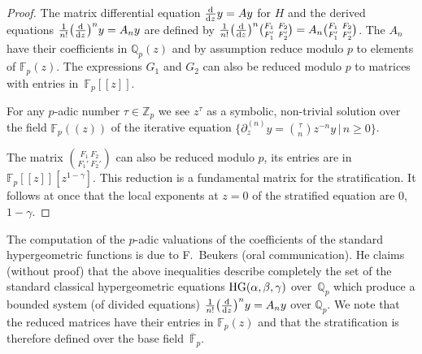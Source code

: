\documentclass[pdftex]{sigma}
\numberwithin{equation}{section}
\begin{document}
\begin{proof}
The matrix differential equation $\frac{{\rm d}}{{\rm d}z} y=Ay$ for $H$ and the derived equations $\frac{1}{n!}\big(\frac{{\rm d}}{{\rm d}z}\big)^ny=A_ny$ are defined by $\frac{1}{n!}\big(\frac{{\rm d}}{{\rm d}z}\big)^n {F_1\ F_2 \choose F_1'\ F_2'}=A_n{F_1\ F_2 \choose F_1' \ F_2'}$. The $A_n$ have their coefficients in $\mathbb{Q}_p(z)$ and by assumption reduce modulo $p$ to elements of $\mathbb{F}_p(z)$. The expressions $G_1$ and $G_2$ can also be reduced modulo $p$ to matrices with entries in~$\mathbb{F}_p[[z]]$.

For any $p$-adic number $\tau \in \mathbb{Z}_p$ we see $z^\tau$ as a symbolic, non-trivial solution over the field $\mathbb{F}_p((z))$ of the iterative equation $\big\{\partial_z^{(n)}y={\tau \choose n }z^{-n}y\, | \, n\geq 0\big\}$.

The matrix ${F_1\ F_2 \choose F_1'\ F_2'}$ can also be reduced modulo $p$, its entries are in $\mathbb{F}_p[[z]][z^{1-\gamma}]$. This reduction is a fundamental matrix for the stratification. It follows at once that the local exponents at $z=0$ of the stratified equation are $0$, $1-\gamma$. \end{proof}

The computation of the $p$-adic valuations of the coefficients of the standard hypergeometric functions is due to F.~Beukers (oral communication). He claims (without proof) that the above inequalities describe completely the set of the standard classical hypergeometric equations ${\rm HG}(\alpha, \beta ,\gamma)$ over~$\mathbb{Q}_p$ which produce a bounded system (of divided equations) $\frac{1}{n!}\big(\frac{{\rm d}}{{\rm d}z}\big)^ny=A_ny$ over $\mathbb{Q}_p$. We note that the reduced matrices have their entries in $\mathbb{F}_p(z)$ and that the stratification is therefore defined over the base field~$\overline{\mathbb{F}}_p$.
\end{document}
